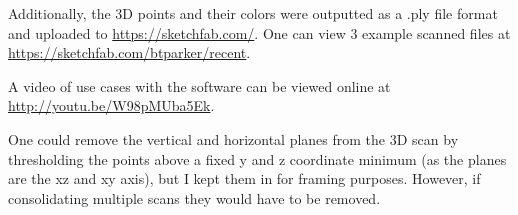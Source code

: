 \documentclass[10pt]{article}
\begin{document}
Additionally, the 3D points and their colors were outputted as a .ply file format and uploaded to \url{https://sketchfab.com/}. One can view 3 example scanned files at \url{https://sketchfab.com/btparker/recent}.

A video of use cases with the software can be viewed online at \url{http://youtu.be/W98pMUba5Ek}.

One could remove the vertical and horizontal planes from the 3D scan by thresholding the points above a fixed y and z coordinate minimum (as the planes are the xz and xy axis), but I kept them in for framing purposes. However, if consolidating multiple scans they would have to be removed.




%
\end{document}
